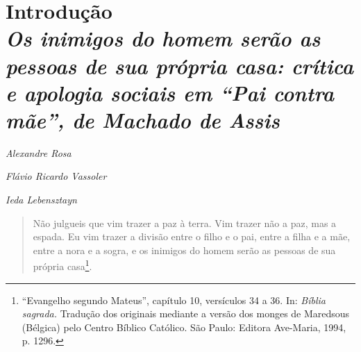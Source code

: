 
\chapter*{Introdução\\
\bigskip
\emph{Os inimigos do homem serão as pessoas de sua própria casa: crítica e apologia sociais em ``Pai contra mãe'', de Machado de
Assis}}


\begin{flushright}
\emph{Alexandre Rosa}

\emph{Flávio Ricardo Vassoler}

\emph{Ieda Lebensztayn}
\end{flushright}

\begin{quote}
Não julgueis que vim trazer a paz à terra. Vim trazer não a paz, mas a
espada. Eu vim trazer a divisão entre o filho e o pai, entre a filha e a
mãe, entre a nora e a sogra, e os inimigos do homem serão as pessoas de
sua própria casa\footnote{``Evangelho segundo Mateus'', capítulo 10,
  versículos 34 a 36. In: \emph{Bíblia sagrada.} Tradução dos originais
  mediante a versão dos monges de Maredsous (Bélgica) pelo Centro
  Bíblico Católico. São Paulo: Editora Ave-Maria, 1994, p. 1296.}.
\end{quote}

